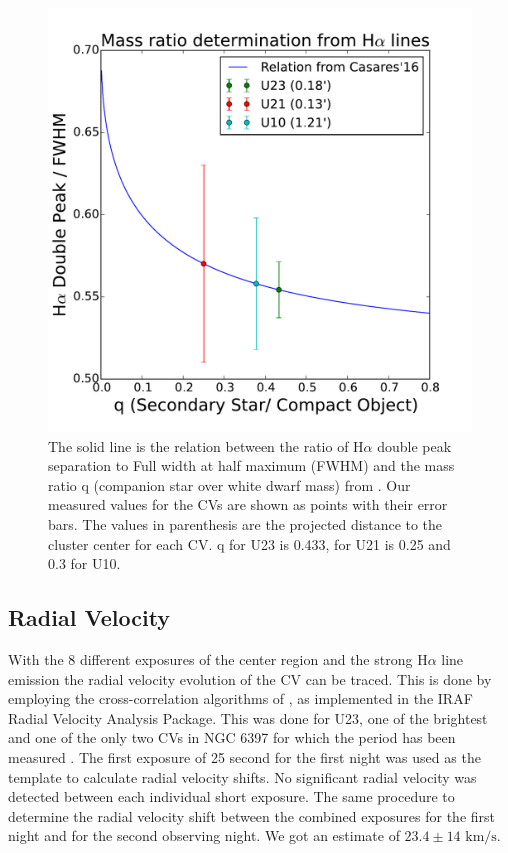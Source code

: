 \begin{figure}[]
        \centering
        \includegraphics[scale=.5]{assets/images/mass.pdf}
\caption{The solid line is the relation between the ratio of H$\alpha$ double peak separation to Full width at half maximum (FWHM) and the mass ratio q (companion star over white dwarf mass) from \cite{casares_massration_20016}. Our measured values for the CVs are shown as points with their error bars. The values in parenthesis are the projected distance to the cluster center for each CV. q for U23 is 0.433, for U21 is 0.25 and 0.3 for U10.}
\label{fig:mass}
\end{figure}

\subsection{Radial Velocity}

With the 8 different exposures of the center region and the strong H$\alpha$ line emission the radial velocity evolution of the CV can be traced. This is done by employing the cross-correlation algorithms of \cite{tonry_cross_1979}, as implemented in the IRAF Radial Velocity Analysis Package. This was done for U23, one of the brightest and one of the only two CVs in NGC 6397 for which the period has been measured \citep{kaluzny_time_2003}. The first exposure of 25 second for the first night was used as the template to calculate radial velocity shifts. No significant radial velocity was detected between each individual short exposure.  The same procedure to determine the radial velocity shift between the combined exposures for the first night and for the second observing night. We got an estimate of $23.4 \pm 14 \text{ km/s}$. 




